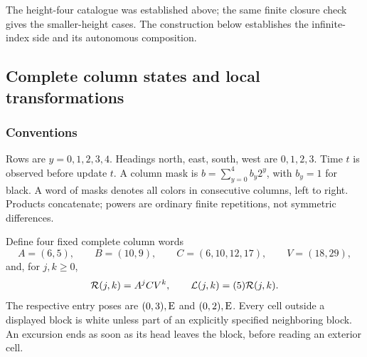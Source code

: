The height-four catalogue was established above; the same finite closure
check gives the smaller-height cases. The construction below establishes
the infinite-index side and its autonomous composition.

\subsection{Complete column states and local transformations}
\subsubsection{Conventions}
Rows are $y=0,1,2,3,4$. Headings north, east, south, west are $0,1,2,3$.
Time $t$ is observed before update $t$. A column mask is
$b=\sum_{y=0}^4 b_y2^y$, with $b_y=1$ for black. A word of masks denotes all
colors in consecutive columns, left to right. Products concatenate; powers
are ordinary finite repetitions, not symmetric differences.

Define four fixed complete column words
\begin{equation}\label{five:eq:blocks}
 A=(6,5),\qquad B=(10,9),\qquad
 C=(6,10,12,17),\qquad V=(18,29),
\end{equation}
and, for $j,k\ge0$,
\begin{equation}\label{five:eq:counter}
 \mathcal R(j,k)=A^jCV^k,\qquad \mathcal L(j,k)=(5)\mathcal R(j,k).
\end{equation}
The respective entry poses are $(0,3),\mathrm E$ and $(0,2),\mathrm E$.
Every cell outside a displayed block is white unless part of an explicitly
specified neighboring block. An excursion ends as soon as its head leaves the
block, before reading an exterior cell.

